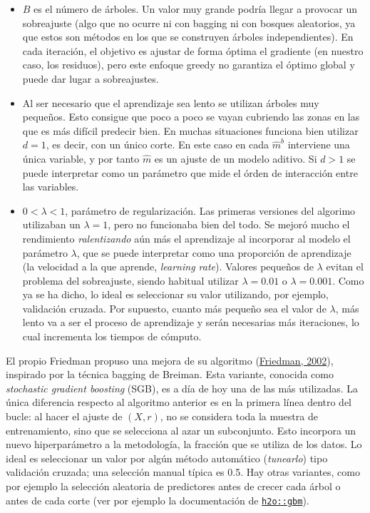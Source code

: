 \documentclass[
]{book}
\theoremstyle{break}
\theoremstyle{nonumberplain}
\begin{document}
\begin{itemize}
\item
  \(B\) es el número de árboles. Un valor muy grande podría llegar a provocar un sobreajuste (algo que no ocurre ni con bagging ni con bosques aleatorios, ya que estos son métodos en los que se construyen árboles independientes). En cada iteración, el objetivo es ajustar de forma óptima el gradiente (en nuestro caso, los residuos), pero este enfoque greedy no garantiza el óptimo global y puede dar lugar a sobreajustes.
\item
  Al ser necesario que el aprendizaje sea lento se utilizan árboles muy pequeños. Esto consigue que poco a poco se vayan cubriendo las zonas en las que es más difícil predecir bien. En muchas situaciones funciona bien utilizar \(d = 1\), es decir, con un único corte. En este caso en cada \(\hat m^b\) interviene una única variable, y por tanto \(\hat m\) es un ajuste de un modelo aditivo. Si \(d>1\) se puede interpretar como un parámetro que mide el órden de interacción entre las variables.
\item
  \(0 < \lambda < 1\), parámetro de regularización. Las primeras versiones del algorimo utilizaban un \(\lambda = 1\), pero no funcionaba bien del todo. Se mejoró mucho el rendimiento \emph{ralentizando} aún más el aprendizaje al incorporar al modelo el parámetro \(\lambda\), que se puede interpretar como una proporción de aprendizaje (la velocidad a la que aprende, \emph{learning rate}). Valores pequeños de \(\lambda\) evitan el problema del sobreajuste, siendo habitual utilizar \(\lambda = 0.01\) o \(\lambda = 0.001\). Como ya se ha dicho, lo ideal es seleccionar su valor utilizando, por ejemplo, validación cruzada. Por supuesto, cuanto más pequeño sea el valor de \(\lambda\), más lento va a ser el proceso de aprendizaje y serán necesarias más iteraciones, lo cual incrementa los tiempos de cómputo.
\end{itemize}

El propio Friedman propuso una mejora de su algoritmo (\protect\hyperlink{ref-friedman2002stochastic}{Friedman, 2002}), inspirado por la técnica bagging de Breiman. Esta variante, conocida como \emph{stochastic gradient boosting} (SGB), es a día de hoy una de las más utilizadas.
La única diferencia respecto al algoritmo anterior es en la primera línea dentro del bucle: al hacer el ajuste de \((X, r)\), no se considera toda la muestra de entrenamiento, sino que se selecciona al azar un subconjunto.
Esto incorpora un nuevo hiperparámetro a la metodología, la fracción que se utiliza de los datos.
Lo ideal es seleccionar un valor por algún método automático (\emph{tunearlo}) tipo validación cruzada; una selección manual típica es 0.5.
Hay otras variantes, como por ejemplo la selección aleatoria de predictores antes de crecer cada árbol o antes de cada corte (ver por ejemplo la documentación de \href{http://docs.h2o.ai/h2o/latest-stable/h2o-docs/data-science/gbm.html}{\texttt{h2o::gbm}}).
\end{document}
